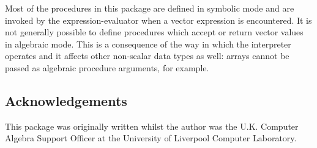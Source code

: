 Most of the procedures in this package are defined in symbolic mode
and are invoked by the \REDUCE expression-evaluator when a vector
expression is encountered. It is not generally possible to define
procedures which accept or return vector values in algebraic mode.
This is a consequence of the way in which the \REDUCE interpreter
operates and it affects other non-scalar data types as well: arrays
cannot be passed as algebraic procedure arguments, for example.


\subsection{Acknowledgements}

This package was originally written whilst the author was the
U.K. Computer Algebra Support Officer at the University of Liverpool
Computer Laboratory.
